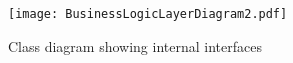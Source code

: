 \documentclass[../report.tex]{subfiles}
\begin{document}
\graphicspath{{img/}{../img/}}

\begin{landscape}
\begin{figure}[!h]
\texttt{[image: BusinessLogicLayerDiagram2.pdf]}
\caption{Class diagram showing internal interfaces}
\label{fig:BusinessLogic_InternalInterfaces}
\end{figure}

\end{landscape}
\restoregeometry
\end{document}
